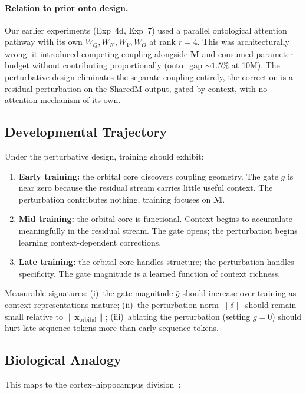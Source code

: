 \documentclass[11pt, a4paper]{article}
\newcommand{\M}{\mathbf{M}}
\newcommand{\x}{\mathbf{x}}
\theoremstyle{remark}
\begin{document}
\paragraph{Relation to prior onto design.}
Our earlier experiments (Exp~4d, Exp~7) used a parallel ontological attention pathway with its own $W_Q, W_K, W_V, W_O$ at rank $r{=}4$.
This was architecturally wrong: it introduced competing coupling alongside $\M$ and consumed parameter budget without contributing proportionally (onto\_gap ${\sim}1.5\%$ at 10M).
The perturbative design eliminates the separate coupling entirely, the correction is a residual perturbation on the SharedM output, gated by context, with no attention mechanism of its own.

\subsection{Developmental Trajectory}

Under the perturbative design, training should exhibit:
\begin{enumerate}[nosep]
    \item \textbf{Early training:} the orbital core discovers coupling geometry. The gate $g$ is near zero because the residual stream carries little useful context. The perturbation contributes nothing, training focuses on $\M$.
    \item \textbf{Mid training:} the orbital core is functional. Context begins to accumulate meaningfully in the residual stream. The gate opens; the perturbation begins learning context-dependent corrections.
    \item \textbf{Late training:} the orbital core handles structure; the perturbation handles specificity. The gate magnitude is a learned function of context richness.
\end{enumerate}

Measurable signatures: (i)~the gate magnitude $\bar{g}$ should increase over training as context representations mature; (ii)~the perturbation norm $\|\delta\|$ should remain small relative to $\|\x_{\text{orbital}}\|$; (iii)~ablating the perturbation (setting $g{=}0$) should hurt late-sequence tokens more than early-sequence tokens.

\subsection{Biological Analogy}

This maps to the cortex--hippocampus division~\cite{mcclelland1995complementary}:
\end{document}
